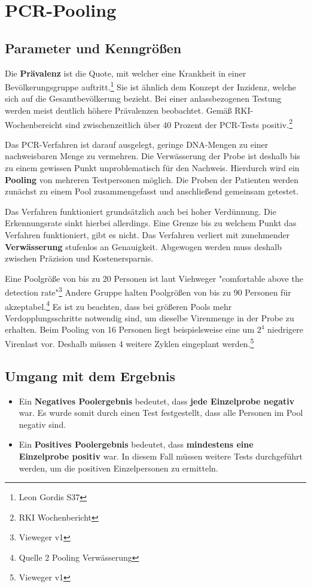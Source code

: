 \cleardoublepage
\chapter{PCR-Pooling}
\section{Parameter und Kenngrößen}

Die \textbf{Prävalenz} ist die Quote, mit welcher eine Krankheit in einer Bevölkerungsgruppe auftritt.\footnote{Leon Gordis S37}
Sie ist ähnlich dem Konzept der Inzidenz, welche sich auf die Gesamtbevölkerung bezieht.
Bei einer anlassbezogenen Testung werden meist deutlich höhere Prävalenzen beobachtet.
Gemäß RKI-Wochenbereicht sind zwischenzeitlich über 40 Prozent der PCR-Tests positiv.\footnote{RKI Wochenbericht}

Das PCR-Verfahren ist darauf ausgelegt, geringe DNA-Mengen zu einer nachweisbaren Menge zu vermehren.
Die Verwässerung der Probe ist deshalb bis zu einem gewissen Punkt unproblematisch für den Nachweis.
Hierdurch wird ein \textbf{Pooling} von mehreren Testpersonen möglich.
Die Proben der Patienten werden zunächst zu einem Pool zusammengefasst und anschließend gemeinsam getestet.

Das Verfahren funktioniert grundsätzlich auch bei hoher Verdünnung.
Die Erkennungsrate sinkt hierbei allerdings.
Eine Grenze bis zu welchem Punkt das Verfahren funktioniert, gibt es nicht.
Das Verfahren verliert mit zunehmender \textbf{Verwässerung} stufenlos an Genauigkeit.
Abgewogen werden muss deshalb zwischen Präzision und Kostenersparnis.

Eine Poolgröße von bis zu 20 Personen ist laut Viehweger "comfortable above the detection rate"\footnote{Vieweger v1}
Andere Gruppe halten Poolgrößen von bis zu 90 Personen für akzeptabel.\footnote{Quelle 2 Pooling Verwässerung}
Es ist zu beachten, dass bei größeren Pools mehr Verdopplungsschritte notwendig sind, um dieselbe Virenmenge in der Probe zu erhalten.
Beim Pooling von 16 Personen liegt beispielsweise eine um $2^{4}$ niedrigere Virenlast vor.
Deshalb müssen 4 weitere Zyklen eingeplant werden.\footnote{Vieweger v1}

\cleardoublepage

\section{Umgang mit dem Ergebnis}
\begin{itemize}
	\item Ein \textbf{Negatives Poolergebnis}
	bedeutet, dass \textbf{jede Einzelprobe negativ} war.
	Es wurde somit durch einen Test festgestellt, dass alle Personen im Pool negativ sind.
	
	\item Ein \textbf{Positives Poolergebnis} bedeutet, dass \textbf{mindestens eine Einzelprobe positiv} war.
	In diesem Fall müssen weitere Tests durchgeführt werden, um die positiven Einzelpersonen zu ermitteln.
\end{itemize}

